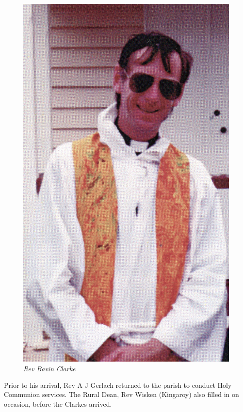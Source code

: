 \begin{figure}
\begin{center}
\includegraphics[width=1.\linewidth,center]{../images/bavin.jpg}
\caption{\itshape Rev Bavin Clarke}
\end{center}
\end{figure}




Prior to his arrival, Rev A J Gerlach returned to the parish to conduct Holy Communion services. The Rural Dean, Rev Wisken (Kingaroy) also filled in on occasion, before the Clarkes arrived.



